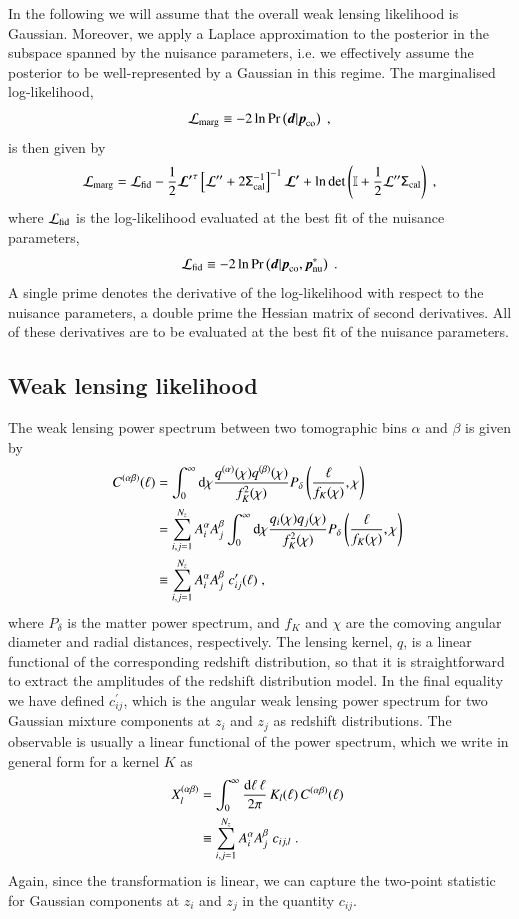 \documentclass{aa}
\newcommand{\eq}[1]{\begin{equation}  #1 \end{equation}}
\newcommand{\eqa}[1]{\begin{align}   #1 \end{align}}
\newcommand{\br}[1]{\left( #1 \right)}
\newcommand{\bb}[1]{\left[ #1 \right]}
\newcommand{\nn}{\nonumber}
\newcommand{\dd}{{\rm d}}
\newcommand{\pr}{{\rm Pr}}
\begin{document}
In the following we will assume that the overall weak lensing likelihood is Gaussian. Moreover, we apply a Laplace approximation to the posterior in the subspace spanned by the nuisance parameters, i.e. we effectively assume the posterior to be well-represented by a Gaussian in this regime. The marginalised log-likelihood,
\eq{
{\cal L}_{\rm marg}  \equiv -2 \ln \pr \br{\boldsymbol{d} | \boldsymbol{p}_{\rm co}}\;,
}
is then given by \citep{taylor10}
\eq{
\label{eq:marginal_likelihood}
{\cal L}_{\rm marg} = {\cal L}_{\rm fid} - \frac{1}{2} \boldsymbol{\cal L^\prime}^\tau  \bb{ {\cal L^{\prime\prime}} + 2 \tens{\Sigma}^{-1}_{\rm cal} }^{-1} \boldsymbol{\cal L^\prime} + \ln \det \br{ \mathbb{I} + \frac{1}{2} {\cal L^{\prime\prime}} \tens{\Sigma}_{\rm cal}}\;,
}
where ${\cal L}_{\rm fid}$ is the log-likelihood evaluated at the best fit of the nuisance parameters,
\eq{
{\cal L}_{\rm fid} \equiv -2 \ln \pr \br{\boldsymbol{d} | \boldsymbol{p}_{\rm co}, \boldsymbol{p}^*_{\rm nu}}\;.
}
A single prime denotes the derivative of the log-likelihood with respect to the nuisance parameters, a double prime the Hessian matrix of second derivatives. All of these derivatives are to be evaluated at the best fit of the nuisance parameters.


\subsection{Weak lensing likelihood}

The weak lensing power spectrum between two tomographic bins $\alpha$ and $\beta$ is given by
\eqa{
C^{(\alpha \beta)}(\ell) &= \int_0^\infty \dd \chi \frac{q^{(\alpha)}(\chi) q^{(\beta)}(\chi)}{f_K^2(\chi)} P_\delta\br{\frac{\ell}{f_K(\chi)},\chi}\; \\ \nn
&= \sum_{i,j=1}^{N_z} A_i^\alpha A_j^\beta  \int_0^\infty \dd \chi \frac{q_i(\chi) q_j(\chi)}{f_K^2(\chi)} P_\delta\br{\frac{\ell}{f_K(\chi)},\chi}\; \\ \nn
&\equiv \sum_{i,j=1}^{N_z} A_i^\alpha A_j^\beta\; c^\prime_{ij}(\ell)\;,
}
where $P_\delta$ is the matter power spectrum, and $f_K$ and $\chi$ are the comoving angular diameter and radial distances, respectively. The lensing kernel, $q$, is a linear functional of the corresponding redshift distribution, so that it is straightforward to extract the amplitudes of the redshift distribution model. In the final equality we have defined $c^\prime_{ij}$, which is the angular weak lensing power spectrum for two Gaussian mixture components at $z_i$ and $z_j$ as redshift distributions. The observable is usually a linear functional of the power spectrum, which we write in general form for a kernel $K$ as
\eqa{
X_l^{(\alpha \beta)} &= \int_0^\infty \frac{\dd \ell\, \ell}{2 \pi}\, K_l(\ell)\, C^{(\alpha \beta)}(\ell)\; \\ \nn
&\equiv \sum_{i,j=1}^{N_z} A_i^\alpha A_j^\beta\; c_{ij,l}\;.
\label{eq:obs}
}
Again, since the transformation is linear, we can capture the two-point statistic for Gaussian components at $z_i$ and $z_j$ in the quantity $c_{ij}$.
\end{document}
